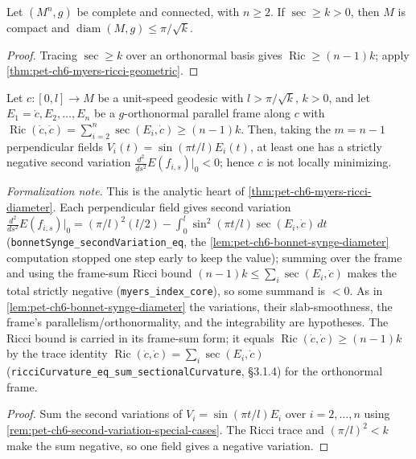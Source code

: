 \begin{corollary}
  \label{cor:pet-ch6-hopf-rinow-myers-geometric}
  \leanok
  Let $(M^n,g)$ be complete and connected, with $n\ge2$. If
  $\sec\ge k>0$, then $M$ is compact and
  $\operatorname{diam}(M,g)\le\pi/\sqrt k$.
\end{corollary}
\begin{proof}
  \leanok
  \sketch
  Tracing \(\sec\ge k\) over an orthonormal basis gives \(\operatorname{Ric}\ge(n-1)k\); apply \cref{thm:pet-ch6-myers-ricci-geometric}.
\end{proof}

\begin{lemma}
  \label{lem:pet-ch6-myers-index}
  \leanok
  Let $c:[0,l]\to M$ be a unit-speed geodesic with $l>\pi/\sqrt k$, $k>0$, and let
  $E_1=\dot c,E_2,\dots,E_n$ be a $g$-orthonormal parallel frame along $c$ with
  $\operatorname{Ric}(\dot c,\dot c)=\sum_{i=2}^n\sec(E_i,\dot c)\ge(n-1)k$. Then, taking the
  $m=n-1$ perpendicular fields $V_i(t)=\sin(\pi t/l)E_i(t)$, at least one has a strictly
  negative second variation $\tfrac{d^2}{ds^2}E(f_{i,s})|_0<0$; hence $c$ is not locally
  minimizing.

  \emph{Formalization note.} This is the analytic heart of \cref{thm:pet-ch6-myers-ricci-diameter}.
  Each perpendicular field gives second variation
  $\tfrac{d^2}{ds^2}E(f_{i,s})|_0=(\pi/l)^2(l/2)-\int_0^l\sin^2(\pi t/l)\sec(E_i,\dot c)\,dt$
  (\texttt{bonnetSynge\_secondVariation\_eq}, the \cref{lem:pet-ch6-bonnet-synge-diameter}
  computation stopped one step early to keep the value); summing over the frame and using the
  frame-sum Ricci bound $(n-1)k\le\sum_i\sec(E_i,\dot c)$ makes the total strictly negative
  (\texttt{myers\_index\_core}), so some summand is $<0$. As in
  \cref{lem:pet-ch6-bonnet-synge-diameter} the variations, their slab-smoothness, the frame's
  parallelism/orthonormality, and the integrability are hypotheses. The Ricci bound is carried in
  its frame-sum form; it equals $\operatorname{Ric}(\dot c,\dot c)\ge(n-1)k$ by the trace identity
  $\operatorname{Ric}(\dot c,\dot c)=\sum_i\sec(E_i,\dot c)$
  (\texttt{ricciCurvature\_eq\_sum\_sectionalCurvature}, §3.1.4) for the orthonormal frame.
\end{lemma}
\begin{proof}
  \leanok
  \sketch
  Sum the second variations of \(V_i=\sin(\pi t/l)E_i\) over \(i=2,\ldots,n\) using \cref{rem:pet-ch6-second-variation-special-cases}. The Ricci trace and \((\pi/l)^2<k\) make the sum negative, so one field gives a negative variation.
\end{proof}

